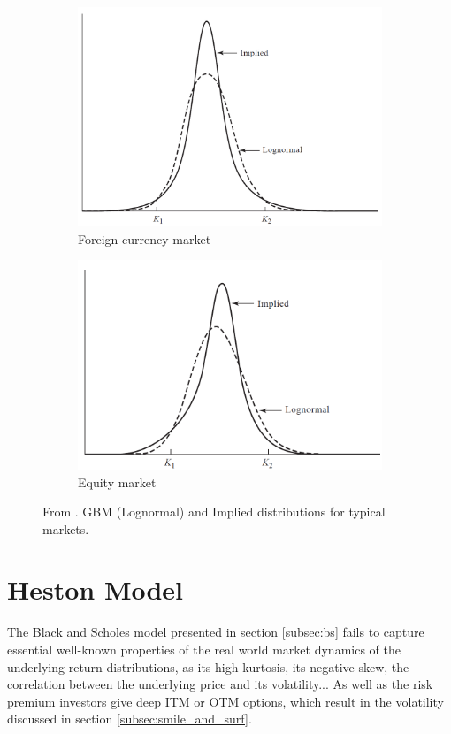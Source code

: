 \documentclass[12,twoside]{mammeTFM}
\theoremstyle{definition}
\theoremstyle{remark}
\begin{document}
\begin{figure}
\centering
\begin{subfigure}{.5\textwidth}
  \centering
  \includegraphics[width=.8\linewidth]{Media/currency_distribution.PNG}
  \caption{Foreign currency market}
\end{subfigure}%
\begin{subfigure}{.5\textwidth}
  \centering
  \includegraphics[width=.9\linewidth]{Media/equity_distribution.PNG}
  \caption{Equity market}
\end{subfigure}
\caption{From \cite{hul09}. GBM (Lognormal) and Implied distributions for typical markets.}
\label{fig:implied_distribution}
\end{figure}

\section{Heston Model} \label{chap:heston_model}

The Black and Scholes model presented in section \ref{subsec:bs} fails to capture essential well-known properties of the real world market dynamics of the underlying return distributions, as its high kurtosis, its negative skew, the correlation between the underlying price and its volatility... As well as the risk premium investors give deep ITM or OTM options, which result in the volatility discussed in section \ref{subsec:smile_and_surf}.
\end{document}
